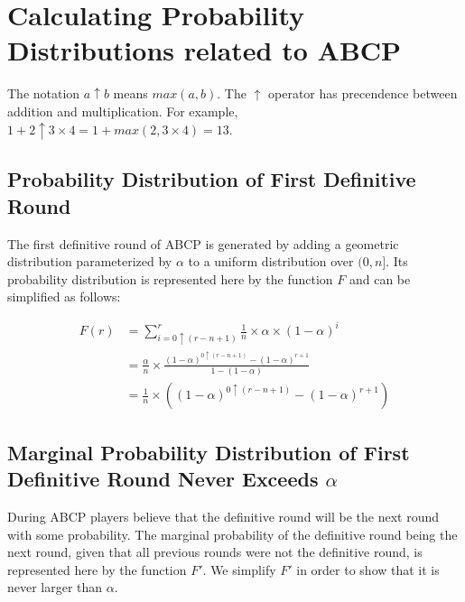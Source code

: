 \documentclass{dalcsthesis}
\begin{document}
\appendix
\chapter{Calculating Probability Distributions related to ABCP }
\label{Appendix:ABCP:Probabilities}

The notation $a \uparrow b$ means $max(a, b)$. The $\uparrow$ operator has precendence between addition and multiplication. For example, $1 + 2 \uparrow 3 \times 4 = 1 + max(2, 3 \times 4) = 13$.

\section{Probability Distribution of First Definitive Round}
\label{Appendix:ABCP:Probabilities:FirstDefinitiveRound}

The first definitive round of ABCP is generated by adding a geometric distribution parameterized by $\alpha$ to a uniform distribution over $(0, n]$. Its probability distribution is represented here by the function $F$ and can be simplified as follows:

\begin{align*}
F(r)
  &= \sum_{i=0 \uparrow (r-n+1)}^r \frac{1}{n} \times \alpha \times (1-\alpha)^i
\\&= \frac{\alpha}{n} \times \frac{(1-\alpha)^{0 \uparrow (r-n+1)} - (1-\alpha)^{r+1}}{1 - (1-\alpha)}
\\&= \frac{1}{n} \times ((1-\alpha)^{0 \uparrow (r-n+1)} - (1-\alpha)^{r+1})
\end{align*}

\section{Marginal Probability Distribution of First Definitive Round Never Exceeds $\alpha$}
\label{Appendix:ABCP:Probabilities:MarginalFirstDefinitiveRoundBelowAlpha}

During ABCP players believe that the definitive round will be the next round with some probability. The marginal probability of the definitive round being the next round, given that all previous rounds were not the definitive round, is represented here by the function $F'$. We simplify $F'$ in order to show that it is never larger than $\alpha$.
\end{document}
